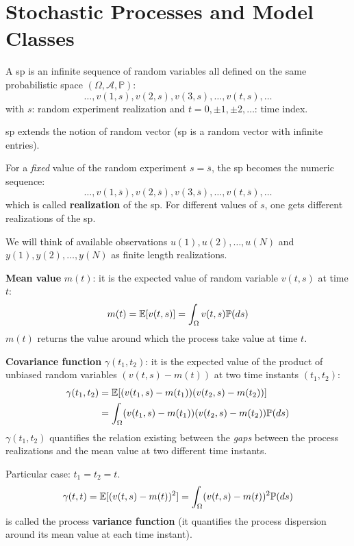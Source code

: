 \chapter{Stochastic Processes and Model Classes}
A \gls{sp} is an infinite sequence of random variables all defined on the same probabilistic space $(\Omega,\mathcal{A},\mathbb{P})$:
\[
	\ldots,v(1,s),v(2,s),v(3,s),\ldots,v(t,s),\ldots
\]
with $s$: random experiment realization and $t=0,\pm 1,\pm 2,\ldots$: time index.

\begin{obs}
	\gls{sp} extends the notion of random vector (\gls{sp} is a random vector with infinite entries).
\end{obs}

\begin{obs}
For a \emph{fixed} value of the random experiment $s = \overline{s}$, the \gls{sp} becomes the numeric sequence:
\[
	\ldots,v(1,\overline{s}),v(2,\overline{s}),v(3,\overline{s}),\ldots,v(t,\overline{s}),\ldots
\]
which is called \textbf{realization} of the \gls{sp}.
For different values of $s$, one gets different realizations of the \gls{sp}.
\end{obs}

We will think of available observations ${u(1),u(2),\ldots,u(N)}$ and ${y(1), y(2),\ldots, y(N)}$ as finite length realizations.

\textbf{Mean value} $m(t)$: it is the expected value of random variable $v(t,s)$ at time $t$:
\[
	m(t)=\mathbb{E}[v(t, s)]=\int_{\Omega} v(t, s) \mathbb{P}(ds)
\]
$m(t)$ returns the value around which the process take value at time $t$.

\textbf{Covariance function} $\gamma(t_{1}, t_{2})$: it is the expected value of the product of unbiased random variables $(v(t, s)-m(t))$ at two time instants $(t_{1}, t_{2}):$
\begin{align*}
	\gamma(t_{1}, t_{2}) &=\mathbb{E}[(v(t_{1}, s)-m(t_{1}))(v(t_{2}, s)-m(t_{2}))] \\
	&=\int_{\Omega}(v(t_{1}, s)-m(t_{1}))(v(t_{2}, s)-m(t_{2})) \mathbb{P}(ds)
\end{align*}
$\gamma(t_{1}, t_{2})$ quantifies the relation existing between the \emph{gaps} between the process realizations and the mean value at two different time instants.

Particular case: $t_{1}=t_{2}=t$.
\[
	\gamma(t, t)=\mathbb{E}[(v(t, s)-m(t))^{2}]=\int_{\Omega}(v(t, s)-m(t))^{2} \mathbb{P}(ds)
\]
is called the process \textbf{variance function} (it quantifies the process dispersion around its mean value at each time instant).

